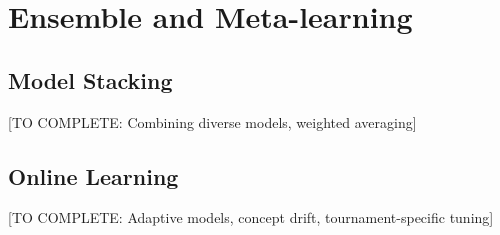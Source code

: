 \section{Ensemble and Meta-learning}

\subsection{Model Stacking}

[TO COMPLETE: Combining diverse models, weighted averaging]

\subsection{Online Learning}

[TO COMPLETE: Adaptive models, concept drift, tournament-specific tuning]